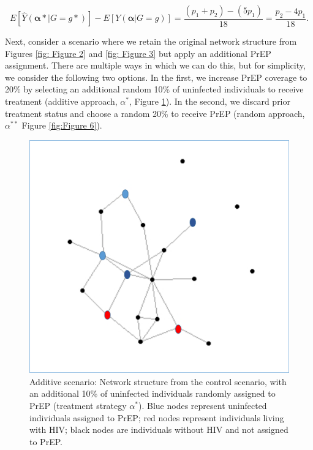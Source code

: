 \documentclass{article}
\theoremstyle{definition}
\begin{document}
\begin{equation}\label{eq:12}
E[\hat{Y}\left(\mathbf{\alpha*}|G=g*\right)] -E[Y\left(\mathbf{\alpha}|G=g\right)] = \frac{\left(p_1 +p_2\right)-\left(5p_1\right)}{18}= \frac{p_2-4p_1}{18}.
\end{equation}


Next, consider a scenario where we retain the original network structure from Figures \ref{fig: Figure 2} and \ref{fig: Figure 3} but apply an additional PrEP assignment. There are multiple ways in which we can do this, but for simplicity, we consider the following two options. In the first, we increase PrEP coverage to 20\% by selecting an additional random 10\% of uninfected individuals to receive treatment (additive approach, $\alpha^*$, Figure \ref{fig: Figure 5}). In the second, we discard prior treatment status and choose a random 20\% to receive PrEP (random approach, $\alpha^{**}$ Figure \ref{fig:Figure 6}).


\begin{figure}[H]
    \centering
    \includegraphics[scale=0.5]{Original Figures/Network Example 4.png}
    \caption{Additive scenario: Network structure from the control scenario, with an additional 10\%  of uninfected individuals randomly assigned to PrEP (treatment strategy $\alpha^*$). Blue nodes represent uninfected individuals assigned to PrEP; red nodes represent individuals living with HIV; black nodes are individuals without HIV and not assigned to PrEP.}
    \label{fig: Figure 5}
\end{figure}
\end{document}

